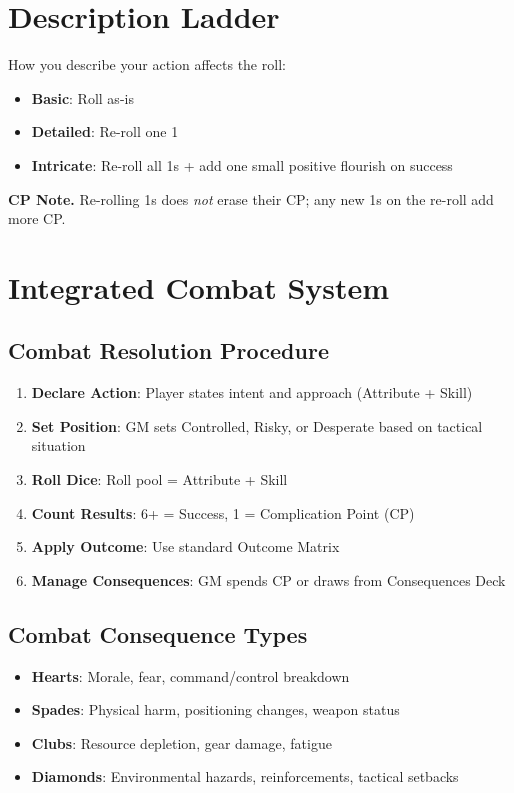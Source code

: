 \documentclass[11pt]{article}
\begin{document}
\section{Description Ladder}

How you describe your action affects the roll:

\begin{itemize}
    \item \textbf{Basic}: Roll as-is
    \item \textbf{Detailed}: Re-roll one 1
    \item \textbf{Intricate}: Re-roll all 1s + add one small positive flourish on success
\end{itemize}

\noindent\textbf{CP Note.} Re-rolling 1s does \emph{not} erase their CP; any new 1s on the re-roll add more CP.

\section{Integrated Combat System}

\subsection{Combat Resolution Procedure}
\begin{enumerate}
    \item \textbf{Declare Action}: Player states intent and approach (Attribute + Skill)
    \item \textbf{Set Position}: GM sets Controlled, Risky, or Desperate based on tactical situation
    \item \textbf{Roll Dice}: Roll pool = Attribute + Skill
    \item \textbf{Count Results}: 6+ = Success, 1 = Complication Point (CP)
    \item \textbf{Apply Outcome}: Use standard Outcome Matrix
    \item \textbf{Manage Consequences}: GM spends CP or draws from Consequences Deck
\end{enumerate}

\subsection{Combat Consequence Types}
\begin{itemize}
    \item \textbf{Hearts}: Morale, fear, command/control breakdown
    \item \textbf{Spades}: Physical harm, positioning changes, weapon status
    \item \textbf{Clubs}: Resource depletion, gear damage, fatigue
    \item \textbf{Diamonds}: Environmental hazards, reinforcements, tactical setbacks
\end{itemize}
\end{document}
